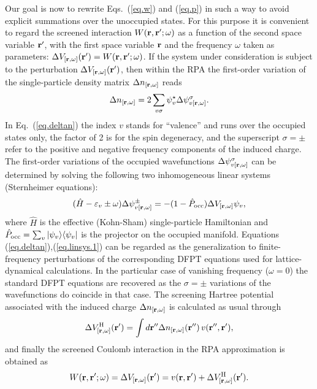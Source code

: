 \documentclass[twocolumn,prb,showpacs,superscriptaddress]{revtex4}
\def\w{\omega}
\def\H{\hat{H}}
\def\P{\hat{P}_{\rm occ}}
\def\E{\varepsilon}
\def\s{\sigma}
\def\r{{\bf r}}
\def\rp{{\bf r^\prime}}
\def\rpp{{\bf r^{\prime\prime}}}
\begin{document}
Our goal is now to rewrite Eqs.\ (\ref{eq.w}) and (\ref{eq.p})
in such a way to avoid explicit summations over the unoccupied states.
For this purpose it is convenient to regard the screened interaction
$W(\r,\rp;\w)$ as a function of the 
second space variable $\rp$, with the first space variable 
$\r$ and the frequency $\w$ taken as parameters: $\Delta V_{[\r,\w]}(\rp) = W(\r,\rp;\w)$.
If the system under consideration is subject to the perturbation
$\Delta V_{[\r,\w]}(\rp)$, then within the RPA the first-order variation 
of the single-particle density matrix $\Delta n_{[\r,\w]}$ reads
  \begin{equation}\label{eq.deltan}
  \Delta n_{[\r,\w]} = 2\sum_{v\s} \psi_v^\star  \Delta \psi^\s_{v[\r,\w]}.
  \end{equation}
In Eq.\ (\ref{eq.deltan}) the index $v$ stands for ``valence'' and runs
over the occupied states only, the factor of 2 is for the spin degeneracy, 
and the superscript $\sigma=\pm$ refer to the positive and negative
frequency components of the induced charge.
The first-order variations of the occupied wavefunctions $\Delta \psi^\s_{v[\r,\w]}$
can be determined by solving the following two inhomogeneous linear systems (Sternheimer equations):
  \begin{equation}\label{eq.linsys.1}
  (\H-\E_v\pm\w) \Delta \psi^\pm_{v[\r,\w]}  = -(1-\P)  \Delta V_{[\r,\w]} \psi_v, 
  \end{equation}
where $\H$ is the effective (Kohn-Sham) single-particle Hamiltonian and 
$\P=\sum_v |\psi_v\rangle\langle\psi_v|$ is the projector
on the occupied manifold. 
Equations (\ref{eq.deltan}),(\ref{eq.linsys.1}) can be regarded as 
the generalization to finite-frequency perturbations of the corresponding DFPT equations
used for lattice-dynamical calculations.\cite{baroni.rmp} 
In the particular case of vanishing frequency ($\w=0$)
the standard DFPT equations are recovered as the $\sigma=\pm$ variations
of the wavefunctions do coincide in that case.
The screening Hartree potential associated with the induced charge 
$\Delta n_{[\r,\w]}$ is calculated as usual through
  \begin{equation}\label{eq.dhartree}
  \Delta V^{\rm H}_{[\r,\w]}(\rp) = \int d\rpp \Delta n_{[\r,\w]} (\rpp) \, v(\rpp,\rp),
  \end{equation}
and finally the screened Coulomb interaction in the RPA approximation is obtained as 
  \begin{equation}\label{eq.w.dfpt}
  W(\r,\rp;\w) = \Delta V_{[\r,\w]}(\rp) = v(\r,\rp) + \Delta V^{\rm H}_{[\r,\w]}(\rp).
  \end{equation}
\end{document}
